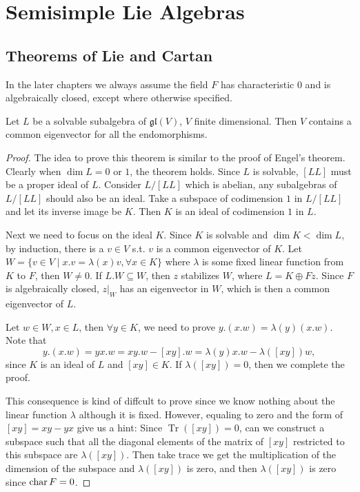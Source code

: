 \chapter{Semisimple Lie Algebras}
\section{Theorems of Lie and Cartan}
In the later chapters we always assume the field $F$ has characteristic $0$ and is algebraically closed, except where otherwise specified.

\begin{theorem}
    Let $L$ be a solvable subalgebra of $\mathfrak{gl}(V)$, $V$ finite dimensional. Then $V$ contains a common eigenvector for all the endomorphisms.
\end{theorem}
\begin{proof}
    The idea to prove this theorem is similar to the proof of Engel's theorem. Clearly when $\operatorname{dim} L=0$ or $1$, the theorem holds. Since $L$ is solvable, $[LL]$ must be a proper ideal of $L$. Consider $L/[LL]$ which is abelian, any subalgebras of $L/[LL]$ should also be an ideal. Take a subspace of codimension $1$ in $L/[LL]$ and let its inverse image be $K$. Then $K$ is an ideal of codimension $1$ in $L$.

    Next we need to focus on the ideal $K$. Since $K$ is solvable and $\operatorname{dim}K<\operatorname{dim}L$, by induction, there is a $v \in V$ s.t. $v$ is a common eigenvector of $K$. Let $W=\{ v \in V \mid x.v=\lambda(x)v, \forall x \in K  \}$ where $\lambda$ is some fixed linear function from $K$ to $F$, then $W\neq 0$. If $L.W \subseteq W$, then $z$ stabilizes $W$, where $L=K\oplus Fz$. Since $F$ is algebraically closed, $z|_W$ has an eigenvector in $W$, which is then a common eigenvector of $L$.

    Let $w \in W, x \in L$, then $\forall y \in K$, we need to prove $y.(x.w)=\lambda(y) (x.w)$. Note that 
    \begin{equation*}
        y.(x.w)=yx.w=xy.w-[xy].w=\lambda(y)x.w-\lambda([xy])w,
    \end{equation*}
    since $K$ is an ideal of $L$ and $[xy] \in K$. If $\lambda([xy])=0$, then we complete the proof.

    This consequence is kind of diffcult to prove since we know nothing about the linear function $\lambda$ although it is fixed. However, equaling to zero and the form of $[xy]=xy-yx$ give us a hint: Since $\operatorname{Tr}([xy])=0$, can we construct a subspace such that all the diagonal elements of the matrix of $[xy]$ restricted to this subspace are $\lambda([xy])$. Then take trace we get the multiplication of the dimension of the subspace and $\lambda([xy])$ is zero, and then $\lambda([xy])$ is zero since $\operatorname{char} F=0$.


\end{proof}
